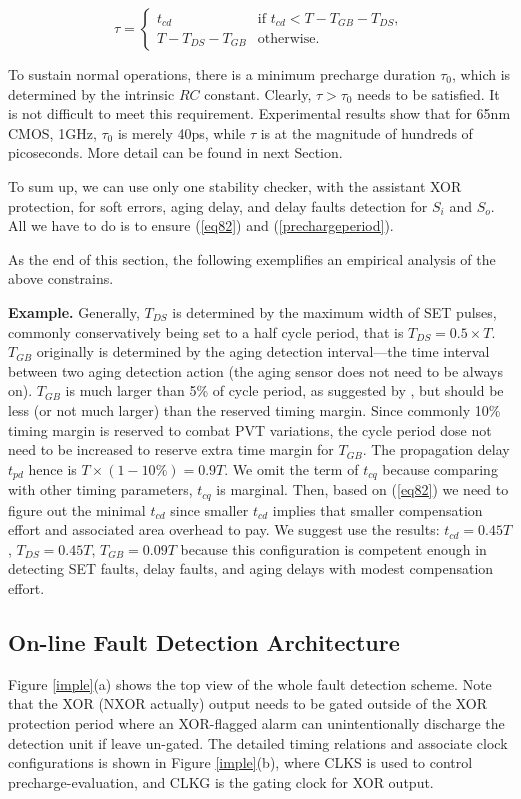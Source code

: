 \[\label{tao}
\tau = \left\{
\begin{array}{ll}
 t_{cd} & \mbox{if } t_{cd}<T-T_{GB}-T_{DS}, \\
 T-T_{DS}-T_{GB} & \mbox{otherwise}.
 \end{array} \right.
\]

To sustain normal operations, there is a minimum precharge duration $\tau_0$, which is determined by the intrinsic $RC$ constant. Clearly, $\tau > \tau_0$ needs to be satisfied. It is not difficult to meet this requirement. Experimental results show that for 65nm CMOS, 1GHz, $\tau_0$ is merely 40ps, while $\tau$ is at the magnitude of hundreds of picoseconds. More detail can be found in next Section.

To sum up, we can use only one stability checker, with the assistant XOR protection, for soft errors, aging delay, and delay faults detection for $S_i$ and $S_o$. All we have to do is to ensure (\ref{eq82}) and (\ref{prechargeperiod}).

As the end of this section, the following exemplifies an empirical analysis of the above constrains.

\vspace{0.3cm} {\bf Example.} Generally, $T_{DS}$ is determined by the maximum width of SET pulses, commonly conservatively being set to a half cycle period, that is $T_{DS}=0.5\times T$. $T_{GB}$ originally is determined by the aging detection interval---the time interval between two aging detection action (the aging sensor does not need to be always on).  $T_{GB}$ is much larger than 5\% of cycle period, as suggested by \cite{failure_prediction_07}, but should be less (or not much larger) than the reserved timing margin. Since commonly 10\% timing margin is reserved to combat PVT variations, the cycle period dose not need to be increased to reserve extra time margin for $T_{GB}$. The propagation delay $t_{pd}$ hence is $T\times(1-10\%)=0.9T$. We omit the term of $t_{cq}$ because comparing with other timing parameters, $t_{cq}$ is marginal. Then, based on (\ref{eq82}) we need to figure out the minimal $t_{cd}$ since smaller $t_{cd}$ implies that smaller compensation effort and associated area overhead to pay. We suggest use the results: $t_{cd}=0.45T$, $T_{DS} = 0.45T$, $T_{GB}=0.09T$ because this configuration is competent enough in detecting SET faults, delay faults, and aging delays with modest compensation effort.

\subsection{On-line Fault Detection Architecture}
Figure \ref{imple}(a) shows the top view  of the whole fault detection scheme. Note that the XOR (NXOR actually) output needs to be gated outside of the XOR protection period where an XOR-flagged alarm can unintentionally discharge the detection unit if leave un-gated. The detailed timing relations and associate clock configurations is shown in Figure \ref{imple}(b), where CLKS is used to control precharge-evaluation, and CLKG is the gating clock for XOR output.

